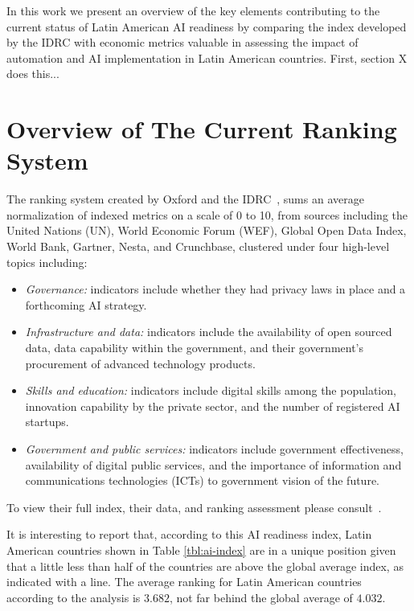 \documentclass[conference]{IEEEtran}
\begin{document}
In this work we present an overview of the key elements contributing to the current status of Latin American AI readiness by comparing the index developed by the IDRC with economic metrics valuable in assessing the impact of automation and AI implementation in Latin American countries. 
First, section X does this...

\section{Overview of The Current Ranking System}

The ranking system created by Oxford and the IDRC~\cite{miller2019government}, sums an average normalization of indexed metrics on a scale of 0 to 10, from sources including the United Nations (UN), World Economic Forum (WEF), Global Open Data Index, World Bank, Gartner, Nesta, and Crunchbase, clustered under four high-level topics including:
\begin{itemize}
  \item \emph{Governance:} indicators include whether they had privacy laws in place and a forthcoming AI strategy.
  \item \emph{Infrastructure and data:} indicators include the availability of open sourced data, data capability within the government, and their government's procurement of advanced technology products.
  \item \emph{Skills and education:} indicators include digital skills among the population, innovation capability by the private sector, and the number of registered AI startups.
  \item \emph{Government and public services:} indicators include government effectiveness, availability of digital public services, and the importance of information and communications technologies (ICTs) to government vision of the future.
\end{itemize}
To view their full index, their data, and ranking assessment please consult~\cite{miller2019shared}.

It is interesting to report that, according to this AI readiness index, Latin American countries shown in Table \ref{tbl:ai-index} are in a unique position given that a little less than half of the countries are above the global average index, as indicated with a line. The average ranking for Latin American countries according to the analysis is $3.682$, not far behind the global average of $4.032$.
\end{document}
